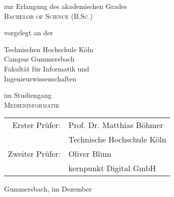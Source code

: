 \begin{titlepage}
\begin{center}
\vspace{1.2cm}

\begin{large}
zur Erlangung des akademischen Grades\\
\vspace{0.1cm}
\textsc{Bachelor of Science (B.Sc.)}\\ 
\end{large}

\vspace{0.6cm}

\begin{large}
vorgelegt an der\\ 
\vspace{0.2cm}
\begin{scshape}
Technischen Hochschule Köln\\
Campus Gummersbach\\
Fakultät für Informatik und\\
Ingenieurwissenschaften\\
\end{scshape}
\end{large}

\vspace{0.6cm}

\begin{large}
im Studiengang\\ 
\vspace{0.1cm}
\textsc{Medieninformatik}
\end{large}


\vspace{1.2cm}

\begin{tabular}{rl}
        Erster Prüfer:  &  Prof. Dr. Matthias Böhmer\\
       					&  \small Technische Hochschule Köln \\[1.0em]
       Zweiter Prüfer:  &  Oliver Blum\\
       					&  \small kernpunkt Digital GmbH\\
\end{tabular}

\vspace{1.2cm}

\begin{large}
Gummersbach, im Dezember \the\year
\end{large}


\end{center}
\end{titlepage}

